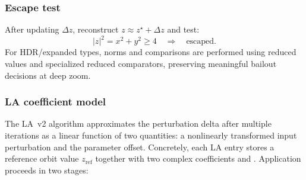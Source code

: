 \subsubsection{Escape test}
After updating \(\Delta z\), reconstruct \(z\approx z^\star+\Delta z\) and test:
\[
|z|^2 = x^2+y^2 \ge 4 \quad\Rightarrow\quad \text{escaped.}
\]
For HDR/expanded types, norms and comparisons are performed using reduced values
and specialized reduced comparators, preserving meaningful bailout decisions at
deep zoom.

\subsubsection{LA coefficient model}
\label{sec:la-coeff-model}

The LA~v2 algorithm approximates the perturbation delta after multiple
iterations as a linear function of two quantities: a nonlinearly transformed
input perturbation and the parameter offset.  Concretely, each LA entry stores
a reference orbit value \(z_\mathrm{ref}\) together with two complex
coefficients  and .  Application proceeds in two
stages:
